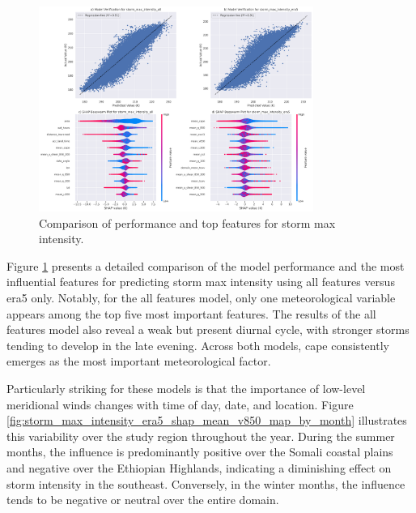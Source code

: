 \begin{figure}[ht]
    \centering
    \includegraphics[width=0.8\textwidth]{../figures/generated/experiments/storm_max_intensity/storm_max_intensity_summary.png}
    \caption{Comparison of performance and top features for storm max intensity.}
    \label{fig:storm_max_intensity_summary}
\end{figure}

Figure \ref{fig:storm_max_intensity_summary} presents a detailed comparison of the model performance and the most influential features for predicting storm max intensity using all features versus \acrshort{era5} only. Notably, for the all features model, only one meteorological variable appears among the top five most important features. The results of the all features model also reveal a weak but present diurnal cycle, with stronger storms tending to develop in the late evening. Across both models, \acrshort{cape} consistently emerges as the most important meteorological factor.

Particularly striking for these models is that the importance of low-level meridional winds changes with time of day, date, and location. Figure \ref{fig:storm_max_intensity_era5_shap_mean_v850_map_by_month} illustrates this variability over the study region throughout the year. During the summer months, the influence is predominantly positive over the Somali coastal plains and negative over the Ethiopian Highlands, indicating a diminishing effect on storm intensity in the southeast. Conversely, in the winter months, the influence tends to be negative or neutral over the entire domain.


